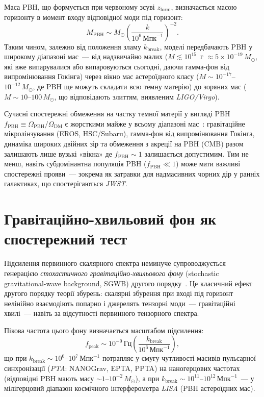Маса PBH, що формується при червоному зсуві $z_\mathrm{form}$, визначається масою горизонту в момент входу відповідної моди під горизонт:
\begin{equation}
  M_\mathrm{PBH} \sim M_\odot \left(\frac{k}{10^6\,\text{Мпк}^{-1}}\right)^{-2}.
\end{equation}
Таким чином, залежно від положення зламу $k_\mathrm{break}$, моделі передбачають PBH у широкому діапазоні мас~--- від надзвичайно малих ($M \lesssim 10^{15}$~г $\approx 5\times10^{-19}\,M_\odot$, які вже випарувалися або випаровуються сьогодні, даючи гамма-фон від випромінювання Гокінга) через вікно мас астероїдного класу ($M \sim 10^{-17}$--$10^{-12}\,M_\odot$, де PBH ще можуть складати всю темну матерію) до зоряних мас ($M \sim 10$--$100\,M_\odot$, що відповідають злиттям, виявленим \emph{LIGO/Virgo}).

Сучасні спостережні обмеження на частку темної матерії у вигляді PBH $f_\mathrm{PBH} \equiv \Omega_\mathrm{PBH}/\Omega_\mathrm{DM}$ є жорсткими майже у всьому діапазоні мас~\cite{Carr2021}: гравітаційне мікролінзування (EROS, HSC/Subaru), гамма-фон від випромінювання Гокінга, динаміка широких двійних зір та обмеження з акреції на PBH (CMB) разом залишають лише вузькі «вікна» де $f_\mathrm{PBH} \sim 1$ залишається допустимим. Тим не менш, навіть субдомінантна популяція PBH ($f_\mathrm{PBH} \ll 1$) може мати важливі спостережні прояви~--- зокрема як затравки для надмасивних чорних дір у ранніх галактиках, що спостерігаються \emph{JWST}.

\section{Гравітаційно-хвильовий фон як спостережний тест}
\label{sec:sgwb}

Підсилення первинного скалярного спектра неминуче супроводжується генерацією \emph{стохастичного гравітаційно-хвильового фону} (stochastic gra\-vita\-ti\-onal-wave background, SGWB) другого порядку~\cite{Kohri2018}. Це класичний ефект другого порядку теорії збурень: скалярні збурення при вході під горизонт нелінійно взаємодіють попарно і джерелять тензорні моди~--- гравітаційні хвилі~--- навіть за відсутності первинного тензорного спектра.

Пікова частота цього фону визначається масштабом підсилення:
\begin{equation}
  f_\mathrm{peak} \sim 10^{-9}\,\text{Гц}
  \left(\frac{k_\mathrm{break}}{10^6\,\text{Мпк}^{-1}}\right),
\end{equation}
що при $k_\mathrm{break}\sim10^6$--$10^7\,\text{Мпк}^{-1}$ потрапляє у смугу чутливості масивів пульсарної синхронізації (\emph{PTA}: NANOGrav, EPTA, PPTA) на наногерцових частотах (відповідні PBH мають масу $\sim 1$--$10^{-2}\,M_\odot$), а при $k_\mathrm{break}\sim10^{11}$--$10^{12}\,\text{Мпк}^{-1}$~--- у мілігерцовий діапазон космічного інтерферометра \emph{LISA} (PBH астероїдних мас).

